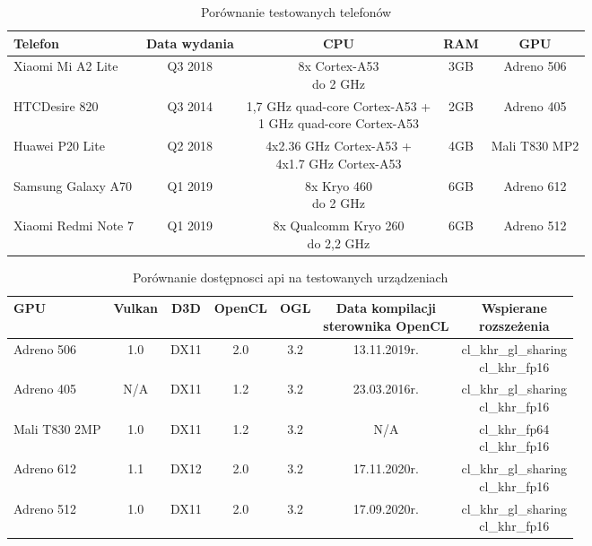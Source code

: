 \begin{table}[H]
    \caption{Porównanie testowanych telefonów}
    \label{tab:skale}
    \begin{tabular}{|l|c|c|c|c|}
\hline
\textbf{Telefon} & \textbf{Data wydania} & \textbf{CPU} & \textbf{RAM} & \textbf{GPU}\\
\hline
Xiaomi Mi A2 Lite & Q3 2018 & \makecell{8x Cortex-A53 \\ do 2 GHz} & 3GB & Adreno 506\\
\hline
HTCDesire 820 & Q3 2014 & \makecell{1,7 GHz quad-core Cortex-A53 + \\ 1 GHz quad-core Cortex-A53} & 2GB & Adreno 405 \\
\hline
Huawei P20 Lite & Q2 2018 & \makecell{4x2.36 GHz Cortex-A53 + \\ 4x1.7 GHz Cortex-A53} & 4GB & Mali T830 MP2 \\
\hline
Samsung Galaxy A70 & Q1 2019 & \makecell{8x Kryo 460 \\ do 2 GHz } & 6GB & Adreno 612 \\
\hline
Xiaomi Redmi Note 7 & Q1 2019 & \makecell{8x Qualcomm Kryo 260 \\ do 2,2 GHz} & 6GB & Adreno 512 \\
\hline
\end{tabular}
\end{table}
\begin{table}[H]
    \caption{Porównanie dostępnosci api na testowanych urządzeniach}
    \label{tab:skale}
    \begin{tabular}{|l|c|c|c|c|c|c|}
\hline
\textbf{GPU} & \textbf{Vulkan} & \textbf{D3D} & \textbf{OpenCL} & \textbf{OGL} & \makecell{\textbf{Data kompilacji} \\ \textbf{sterownika OpenCL}} & \makecell{\textbf{Wspierane} \\ \textbf{rozszeżenia}}\\
\hline
Adreno 506 & 1.0 & DX11 & 2.0 & 3.2 & 13.11.2019r. & \makecell{cl\_khr\_gl\_sharing \\ cl\_khr\_fp16}\\
\hline
Adreno 405 & N/A & DX11 & 1.2 & 3.2 & 23.03.2016r. & \makecell{cl\_khr\_gl\_sharing \\ cl\_khr\_fp16}\\
\hline
Mali T830 2MP & 1.0 & DX11 & 1.2 & 3.2 & N/A & \makecell{cl\_khr\_fp64 \\ cl\_khr\_fp16}\\
\hline
Adreno 612 & 1.1 & DX12 & 2.0 & 3.2 & 17.11.2020r. & \makecell{cl\_khr\_gl\_sharing \\ cl\_khr\_fp16}\\
\hline
Adreno 512 & 1.0 & DX11 & 2.0 & 3.2 & 17.09.2020r. & \makecell{cl\_khr\_gl\_sharing \\ cl\_khr\_fp16}\\
\hline
\end{tabular}
\end{table}


